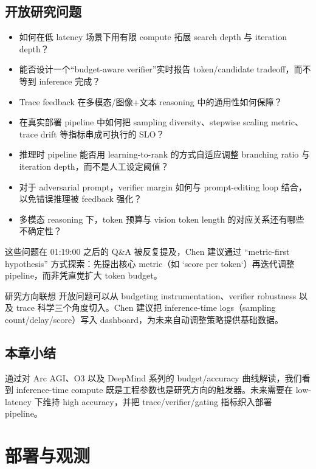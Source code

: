 \documentclass[a4paper]{article}
\begin{document}
\subsection{开放研究问题}
\begin{itemize}
\item 如何在低 latency 场景下用有限 compute 拓展 search depth 与 iteration depth？
\item 能否设计一个“budget-aware verifier”实时报告 token/candidate tradeoff，而不等到 inference 完成？
\item Trace feedback 在多模态/图像+文本 reasoning 中的通用性如何保障？
\item 在真实部署 pipeline 中如何把 sampling diversity、stepwise scaling metric、trace drift 等指标串成可执行的 SLO？
\end{itemize}

\begin{itemize}
\item 推理时 pipeline 能否用 learning-to-rank 的方式自适应调整 branching ratio 与 iteration depth，而不是人工设定阈值？
\item 对于 adversarial prompt，verifier margin 如何与 prompt-editing loop 结合，以免错误推理被 feedback 强化？
\item 多模态 reasoning 下，token 预算与 vision token length 的对应关系还有哪些不确定性？
\end{itemize}

这些问题在 01:19:00 之后的 Q\&A 被反复提及，Chen 建议通过 “metric-first hypothesis” 方式探索：先提出核心 metric（如 `score per token`）再迭代调整 pipeline，而非凭直觉扩大 token budget。

\begin{knowledgebox}{研究方向联想}
开放问题可以从 budgeting instrumentation、verifier robustness 以及 trace 科学三个角度切入。Chen 建议把 inference-time logs（sampling count/delay/score）写入 dashboard，为未来自动调整策略提供基础数据。
\end{knowledgebox}

\subsection{本章小结}
通过对 Arc AGI、O3 以及 DeepMind 系列的 budget/accuracy 曲线解读，我们看到 inference-time compute 既是工程参数也是研究方向的触发器。未来需要在 low-latency 下维持 high accuracy，并把 trace/verifier/gating 指标织入部署 pipeline。

\section{部署与观测}
\end{document}
